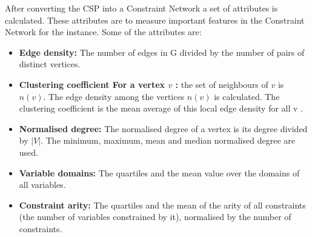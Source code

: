 After converting the CSP into a Constraint Network a set of attributes is calculated. These attributes are to measure important features in the Constraint Network for the instance. Some of the attributes are:
\begin{itemize}
  \item \textbf{Edge density:} The number of edges in G divided by the number of pairs of distinct vertices.\\
  \item \textbf{Clustering coefficient For a vertex $v$ : } the set of neighbours of $v$ is $n(v)$. The edge density among the vertices $n(v)$ is calculated. The clustering coefficient is the mean average of this local edge density for all v \cite{f:feat}.\\
  \item \textbf{Normalised degree:} The normalised degree of a vertex is its degree divided by $|V|$. The minimum, maximum, mean and median normalised degree are used.\\
  \item \textbf{Variable domains:} The quartiles and the mean value over the domains of all
  variables.\\
  \item \textbf{Constraint arity:} The quartiles and the mean of the arity of all constraints
  (the number of variables constrained by it), normalised by the number of
  constraints.\\
\end{itemize}

